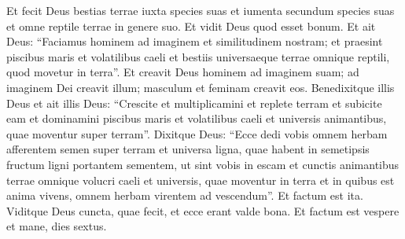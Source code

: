 \begin{biblechapter}
\verse Et fecit Deus bestias terrae iuxta species suas et iumenta secundum species suas et omne reptile terrae in genere suo. Et vidit Deus quod esset bonum.
 \verse Et ait Deus: “Faciamus hominem ad imaginem et similitudinem nostram; et praesint piscibus maris et volatilibus caeli et bestiis universaeque terrae omnique reptili, quod movetur in terra”.
 \verse Et creavit Deus hominem ad imaginem suam;
 ad imaginem Dei creavit illum;
 masculum et feminam creavit eos. 
\verse Benedixitque illis Deus et ait illis Deus: “Crescite et multiplicamini et replete terram et subicite eam et dominamini piscibus maris et volatilibus caeli et universis animantibus, quae moventur super terram”. 
\verse Dixitque Deus: “Ecce dedi vobis omnem herbam afferentem semen super terram et universa ligna, quae habent in semetipsis fructum ligni portantem sementem, ut sint vobis in escam 
\verse et cunctis animantibus terrae omnique volucri caeli et universis, quae moventur in terra et in quibus est anima vivens, omnem herbam virentem ad vescendum”. Et factum est ita. 
\verse Viditque Deus cuncta, quae fecit, et ecce erant valde bona. Et factum est vespere et mane, dies sextus.
 

\end{biblechapter}
